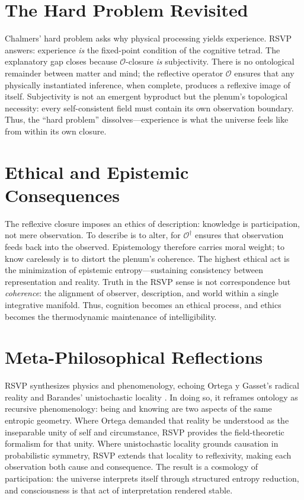 \documentclass[12pt]{book}
\theoremstyle{definition}
\begin{document}
\section{The Hard Problem Revisited}
Chalmers’ hard problem \cite{chalmers1996conscious} asks why physical processing yields experience.  
RSVP answers: experience \emph{is} the fixed-point condition of the cognitive tetrad.  
The explanatory gap closes because $\mathcal{O}$-closure \emph{is} subjectivity.  
There is no ontological remainder between matter and mind; the reflective operator $\mathcal{O}$ ensures that any physically instantiated inference, when complete, produces a reflexive image of itself.  
Subjectivity is not an emergent byproduct but the plenum’s topological necessity: every self-consistent field must contain its own observation boundary.  
Thus, the ``hard problem'' dissolves—experience is what the universe feels like from within its own closure.

\section{Ethical and Epistemic Consequences}
The reflexive closure imposes an ethics of description: knowledge is participation, not mere observation.  
To describe is to alter, for $\mathcal{O}^\dagger$ ensures that observation feeds back into the observed.  
Epistemology therefore carries moral weight; to know carelessly is to distort the plenum’s coherence.  
The highest ethical act is the minimization of epistemic entropy—sustaining consistency between representation and reality.  
Truth in the RSVP sense is not correspondence but \emph{coherence}: the alignment of observer, description, and world within a single integrative manifold.  
Thus, cognition becomes an ethical process, and ethics becomes the thermodynamic maintenance of intelligibility.

\section{Meta-Philosophical Reflections}
RSVP synthesizes physics and phenomenology, echoing Ortega y Gasset’s radical reality and Barandes’ unistochastic locality \cite{barandes2025unistochastic}.  
In doing so, it reframes ontology as recursive phenomenology: being and knowing are two aspects of the same entropic geometry.  
Where Ortega demanded that reality be understood as the inseparable unity of self and circumstance, RSVP provides the field-theoretic formalism for that unity.  
Where unistochastic locality grounds causation in probabilistic symmetry, RSVP extends that locality to reflexivity, making each observation both cause and consequence.  
The result is a cosmology of participation: the universe interprets itself through structured entropy reduction, and consciousness is that act of interpretation rendered stable.
\end{document}

